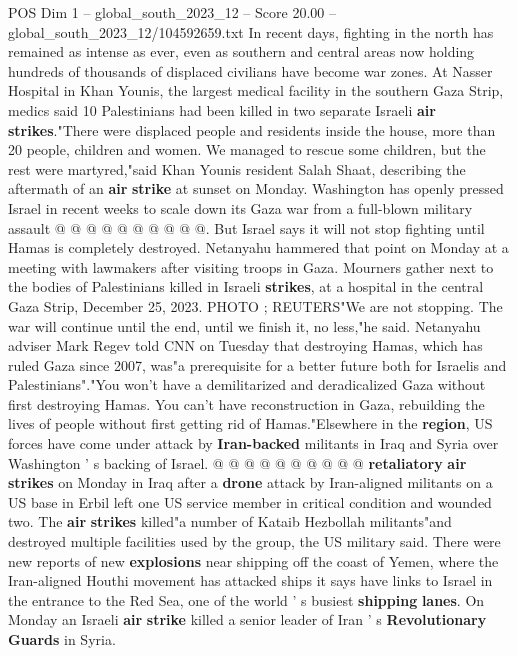 \begin{textsample}{POS Dim 1 – global\_south\_2023\_12 – Score 20.00 – global\_south\_2023\_12/104592659.txt}
In recent days, fighting in the north has remained as intense as ever, even as southern and central areas now holding hundreds of thousands of displaced civilians have become war zones.
At Nasser Hospital in Khan Younis, the largest medical facility in the southern Gaza Strip, medics said 10 Palestinians had been killed in two separate Israeli \textbf{air} \textbf{strikes}."There were displaced people and residents inside the house, more than 20 people, children and women.
We managed to rescue some children, but the rest were martyred,"said Khan Younis resident Salah Shaat, describing the aftermath of an \textbf{air} \textbf{strike} at sunset on Monday.
Washington has openly pressed Israel in recent weeks to scale down its Gaza war from a full-blown military assault @ @ @ @ @ @ @ @ @ @.
But Israel says it will not stop fighting until Hamas is completely destroyed.
Netanyahu hammered that point on Monday at a meeting with lawmakers after visiting troops in Gaza.
Mourners gather next to the bodies of Palestinians killed in Israeli \textbf{strikes}, at a hospital in the central Gaza Strip, December 25, 2023.
PHOTO ; REUTERS"We are not stopping.
The war will continue until the end, until we finish it, no less,"he said.
Netanyahu adviser Mark Regev told CNN on Tuesday that destroying Hamas, which has ruled Gaza since 2007, was"a prerequisite for a better future both for Israelis and Palestinians"."You won't have a demilitarized and deradicalized Gaza without first destroying Hamas.
You can't have reconstruction in Gaza, rebuilding the lives of people without first getting rid of Hamas."Elsewhere in the \textbf{region}, US forces have come under attack by \textbf{Iran-backed} militants in Iraq and Syria over Washington ' s backing of Israel. @ @ @ @ @ @ @ @ @ @ \textbf{retaliatory} \textbf{air} \textbf{strikes} on Monday in Iraq after a \textbf{drone} attack by Iran-aligned militants on a US base in Erbil left one US service member in critical condition and wounded two.
The \textbf{air} \textbf{strikes} killed"a number of Kataib Hezbollah militants"and destroyed multiple facilities used by the group, the US military said.
There were new reports of new \textbf{explosions} near shipping off the coast of Yemen, where the Iran-aligned Houthi movement has attacked ships it says have links to Israel in the entrance to the Red Sea, one of the world ' s busiest \textbf{shipping} \textbf{lanes}.
On Monday an Israeli \textbf{air} \textbf{strike} killed a senior leader of Iran ' s \textbf{Revolutionary} \textbf{Guards} in Syria.

\end{textsample}
